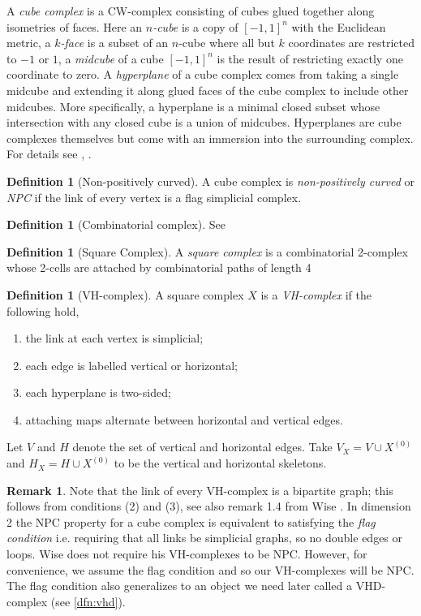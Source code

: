 \documentclass[12pt,parskip=full]{report}
\theoremstyle{plain}
\theoremstyle{definition}
\newtheorem{rmk}[thm]{Remark}
\newtheorem{dfn}[thm]{Definition}
\begin{document}
A \emph{cube complex} is a CW-complex consisting of cubes glued together along isometries of faces. Here an \emph{\(n\)-cube} is a copy of \([-1,1]^n\) with the Euclidean metric, a \emph{\(k\)-face} is a subset of an \(n\)-cube where all but \(k\) coordinates are restricted to \(-1\) or \(1\), a \emph{midcube} of a cube \([-1,1]^n\) is the result of restricting exactly one coordinate to zero. A \emph{hyperplane} of a cube complex comes from taking a single midcube and extending it along glued faces of the cube complex to include other midcubes. More specifically, a hyperplane is a minimal closed subset whose intersection with any closed cube is a union of midcubes. Hyperplanes are cube complexes themselves but come with an immersion into the surrounding complex. For details see \cite{manning}, \cite{haglundwise}.

\begin{dfn}
    [Non-positively curved]
    A cube complex is \emph{non-positively curved} or \emph{NPC} if the link of every vertex is a flag simplicial complex.
\end{dfn}

\begin{dfn}
    [Combinatorial complex]
    See \cite{bridsonhaefliger}
\end{dfn}

\begin{dfn}
    [Square Complex]
    A \emph{square complex} is a combinatorial 2-complex whose 2-cells are attached by combinatorial paths of length 4
\end{dfn}

\begin{dfn}
    [VH-complex]
    A square complex $X$ is a \emph{VH-complex} if the following hold,
    \begin{enumerate}
        \item the link at each vertex is simplicial;
        \item each edge is labelled vertical or horizontal;
        \item each hyperplane is two-sided;
        \item attaching maps alternate between horizontal and vertical edges.
    \end{enumerate}
    Let $V$ and $H$ denote the set of vertical and horizontal edges. Take $V_X = V \cup X^{(0)}$ and $H_X = H \cup X^{(0)}$ to be the vertical and horizontal skeletons. 
\end{dfn}

\begin{rmk}
Note that the link of every VH-complex is a bipartite graph; this follows from conditions (2) and (3), see also remark 1.4 from Wise \cite{wisethesis}. In dimension 2 the NPC property for a cube complex is equivalent to satisfying the \emph{flag condition} i.e. requiring that all links be simplicial graphs, so no double edges or loops. Wise does not require his VH-complexes to be NPC. However, for convenience, we assume the flag condition and so our VH-complexes will be NPC. The flag condition also generalizes to an object we need later called a VHD-complex (see \ref{dfn:vhd}).
\end{rmk}
\end{document}
